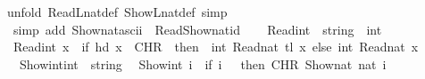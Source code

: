 \begin{isabellebody}
{\isacharparenleft}{\kern0pt}unfold\ ReadL\isactrlsub n\isactrlsub a\isactrlsub t{\isacharunderscore}{\kern0pt}def\ ShowL\isactrlsub n\isactrlsub a\isactrlsub t{\isacharunderscore}{\kern0pt}def{\isacharcomma}{\kern0pt}\ simp{\isacharparenright}{\kern0pt}\isanewline
\ \ \isamarkupfalse%
\ {\isacharparenleft}{\kern0pt}simp\ add{\isacharcolon}{\kern0pt}\ Show\isactrlsub n\isactrlsub a\isactrlsub t{\isacharunderscore}{\kern0pt}ascii\ \ Read{\isacharunderscore}{\kern0pt}Show{\isacharunderscore}{\kern0pt}nat{\isacharunderscore}{\kern0pt}id{\isacharparenright}{\kern0pt}%
\endisatagproof
{\isafoldproof}%
%
\isadelimproof
%
\endisadelimproof
%
\isadelimdocument
%
\endisadelimdocument
%
\isatagdocument
%
\isamarkuptrue%
%
\endisatagdocument
{\isafolddocument}%
%
\isadelimdocument
%
\endisadelimdocument
{}\isamarkupfalse%
\ \isanewline
\ \ Read\isactrlsub i\isactrlsub n\isactrlsub t\ {\isacharcolon}{\kern0pt}{\isacharcolon}{\kern0pt}\ {\isacartoucheopen}string\ {\isasymRightarrow}\ int{\isacartoucheclose}\ \ \isanewline
\ {\isacartoucheopen}Read\isactrlsub i\isactrlsub n\isactrlsub t\ x\ {\isacharequal}{\kern0pt}\ {\isacharparenleft}{\kern0pt}if\ hd\ x\ {\isacharequal}{\kern0pt}\ {\isacharparenleft}{\kern0pt}CHR\ {\isacharprime}{\kern0pt}{\isacharprime}{\kern0pt}{\isacharminus}{\kern0pt}{\isacharprime}{\kern0pt}{\isacharprime}{\kern0pt}{\isacharparenright}{\kern0pt}\ then\ \ {\isacharminus}{\kern0pt}{\isacharparenleft}{\kern0pt}int\ {\isacharparenleft}{\kern0pt}Read\isactrlsub n\isactrlsub a\isactrlsub t\ {\isacharparenleft}{\kern0pt}tl\ x{\isacharparenright}{\kern0pt}{\isacharparenright}{\kern0pt}{\isacharparenright}{\kern0pt}\ else\ int\ {\isacharparenleft}{\kern0pt}Read\isactrlsub n\isactrlsub a\isactrlsub t\ x{\isacharparenright}{\kern0pt}{\isacharparenright}{\kern0pt}{\isacartoucheclose}\isanewline
\isanewline
{}\isamarkupfalse%
\ \isanewline
\ \ Show\isactrlsub i\isactrlsub n\isactrlsub t{\isacharcolon}{\kern0pt}{\isacharcolon}{\kern0pt}{\isacartoucheopen}int\ {\isasymRightarrow}\ string{\isacartoucheclose}\ \isanewline
\ {\isacartoucheopen}Show\isactrlsub i\isactrlsub n\isactrlsub t\ i\ {\isacharequal}{\kern0pt}\ {\isacharparenleft}{\kern0pt}if\ i\ {\isacharless}{\kern0pt}\ {}\ then\ {\isacharparenleft}{\kern0pt}CHR\ {\isacharprime}{\kern0pt}{\isacharprime}{\kern0pt}{\isacharminus}{\kern0pt}{\isacharprime}{\kern0pt}{\isacharprime}{\kern0pt}{\isacharparenright}{\kern0pt}{\isacharhash}{\kern0pt}{\isacharparenleft}{\kern0pt}Show\isactrlsub n\isactrlsub a\isactrlsub t\ {\isacharparenleft}{\kern0pt}nat\ {\isacharparenleft}{\kern0pt}{\isacharminus}{\kern0pt}i{\isacharparenright}{\kern0pt}{\isacharparenright}{\kern0pt}{\isacharparenright}{\kern0pt}\ \isanewline

\end{isabellebody}

